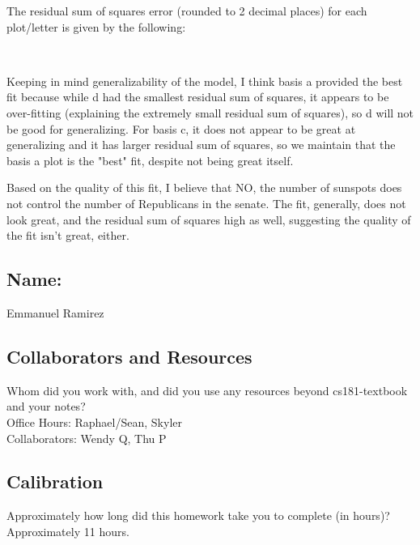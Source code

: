 \documentclass[submit]{harvardml}
\begin{document}
\begin{solution}
\begin{enumerate}
    The residual sum of squares error (rounded to 2 decimal places) for each plot/letter is given by the following:
    
    \begin{center}
         \\
    \end{center}
    
    Keeping in mind generalizability of the model, I think basis a provided the best fit because while d had the smallest residual sum of squares, it appears to be over-fitting (explaining the extremely small residual sum of squares), so d will not be good for generalizing. For basis c, it does not appear to be great at generalizing and it has larger residual sum of squares, so we maintain that the basis a plot is the "best" fit, despite not being great itself.
    
    Based on the quality of this fit, I believe that NO, the number of sunspots does not control the number of Republicans in the senate. The fit, generally, does not look great, and the residual sum of squares high as well, suggesting the quality of the fit isn't great, either.
    
    
\end{enumerate}

\end{solution}



\newpage
\subsection*{Name:} Emmanuel Ramirez

\subsection*{Collaborators and Resources}
Whom did you work with, and did you use any resources beyond cs181-textbook and your notes?\\
Office Hours: Raphael/Sean, Skyler \\ 
Collaborators: Wendy Q, Thu P

\subsection*{Calibration}
Approximately how long did this homework take you to complete (in hours)?\\
Approximately 11 hours.
\end{document}
